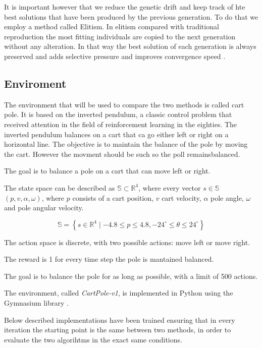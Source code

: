 It is important however that we reduce the genetic drift and keep track of hte best solutions that have been produced by the previous generation. To do that we employ a method called Elitism. In elitism compared with traditional reproduction the most fitting individuals are copied to the next generation without any alteration. In that way the best solution of each generation is always preserved and adds selective pressure and improves convergence speed \cite{du2018elitism}.

\subsection{Enviroment}
The environment that will be used to compare the two methods is called cart pole. It is based on the inverted pendulum, a classic control problem that received attention in the field of reinforcement learning in the eighties. The inverted pendulum balances on a cart that ca go either left or right on a horizontal line. The objective is to maintain the balance of the pole by moving the cart. However the movment should be such so the poll remainsbalanced\cite{moriarty1996efficient}.

The goal is to balance a pole on a cart that can move left or right. 

The state space can be described as $ \mathbb{S} \subset \mathbb{R}^4 $, where every vector $s \in \mathbb{S}$ $(p, v, \alpha, \omega)$, where $p$ consists of a cart position, $v$ cart velocity, $\alpha$ pole angle, $\omega$ and pole angular velocity.

\begin{equation} \label{eqStateSpace}
{\mathbb{S} = \left\{ s \in \mathbb{R}^4 \mid -4.8 \leq p \leq 4.8, 
 -24^\circ \leq \theta \leq 24^\circ \right\}}
\end{equation}

The action space is discrete, with two possible actions: move left or move right. 

The reward is 1 for every time step the pole is mantained balanced.

The goal is to balance the pole for as long as possible, with a limit of 500 actions.

The environment, called \textit{CartPole-v1}, is implemented in Python using the Gymnasium library \cite{towers_gymnasium_2023}. 

Below described implementations have been trained ensuring that in every iteration the starting point is the same between two methods, in order to evaluate the two algorihtms in the exact same conditions.

